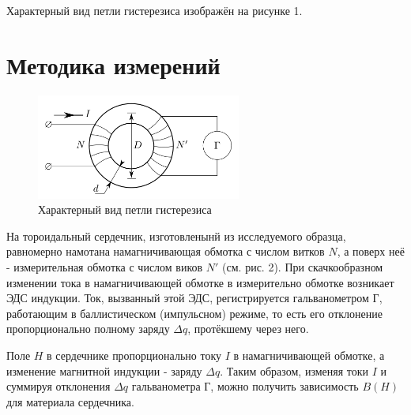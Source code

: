 \documentclass[14pt, a4paper,reqno]{article}
\begin{document}
    Характерный вид петли гистерезиса изображён на рисунке 1.

\section{Методика измерений}

    \begin{figure}[h]
        \begin{center}
            \includegraphics[width = 0.6\textwidth]{images/picture_2.png}
        \end{center}
    \caption{Характерный вид петли гистерезиса}
    \end{figure}
    На тороидальный сердечник, изготовленынй из исследуемого образца, равномерно намотана намагничивающая обмотка с числом витков
    $N$, а поверх неё - измерительная обмотка с числом виков $N'$ (см. рис. 2). При скачкообразном изменении тока в намагничивающей
    обмотке в измерительно обмотке возникает ЭДС индукции. Ток, вызванный этой ЭДС, регистрируется гальванометром Г, работающим в
    баллистическом (импульсном) режиме, то есть его отклонение пропорционально полному заряду $\Delta q$, протёкшему через него.
    
    Поле $H$ в сердечнике пропорционально току $I$ в намагничивающей обмотке, а изменение магнитной индукции - заряду $\Delta q$.
    Таким образом, изменяя токи $I$ и суммируя отклонения $\Delta q$ гальванометра Г, можно получить зависимость $B(H)$ для материала
    сердечника.
\end{document}

